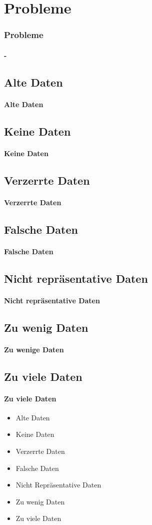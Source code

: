 \section{Probleme}
\begin{frame}
\frametitle{Probleme}
\framesubtitle{-}

\subsection<2>{Alte Daten}
\framesubtitle<2>{Alte Daten}

\subsection<3>{Keine Daten}
\framesubtitle<3>{Keine Daten}

\subsection<4>{Verzerrte Daten}
\framesubtitle<4>{Verzerrte Daten}

\subsection<5>{Falsche Daten}
\framesubtitle<5>{Falsche Daten}

\subsection<6>{Nicht repräsentative Daten}
\framesubtitle<6>{Nicht repräsentative Daten}

\subsection<7>{Zu wenig Daten}
\framesubtitle<7>{Zu wenige Daten}

\subsection<8>{Zu viele Daten}
\framesubtitle<8>{Zu viele Daten}

\begin{itemize}[<+(1)->]
\item Alte Daten
\item Keine Daten
\item Verzerrte Daten
\item Falsche Daten
\item Nicht Repräsentative Daten
\item Zu wenig Daten
\item Zu viele Daten
\end{itemize}
\end{frame}